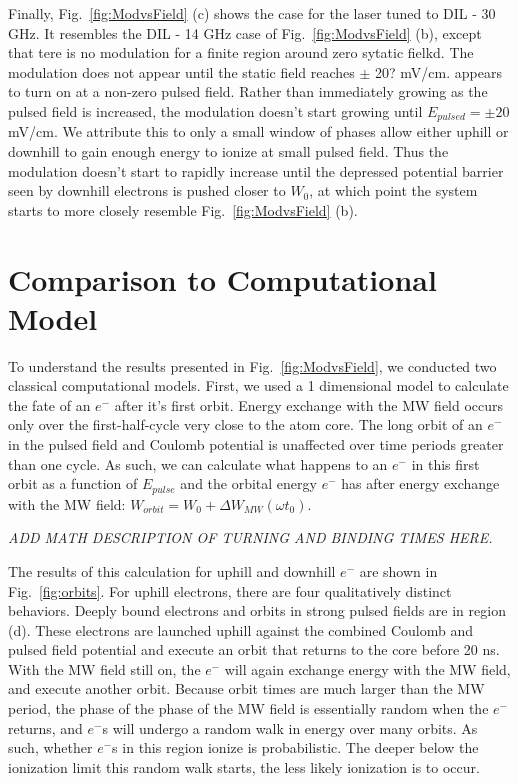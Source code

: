 \documentclass[aps,pra,preprint,groupedaddress]{revtex4-1}
\begin{document}
Finally, Fig.~\ref{fig:ModvsField} (c) shows the case for the laser tuned to DIL - 30 GHz. It resembles the DIL - 14 GHz case of Fig.~\ref{fig:ModvsField} (b), except that tere is no modulation for a finite region around zero sytatic fielkd. The modulation does not appear until the static field reaches $\pm$ 20? mV/cm. appears to turn on at a non-zero pulsed field. Rather than immediately growing as the pulsed field is increased, the modulation doesn't start growing until $E_{pulsed} = \pm 20$ mV/cm. We attribute this to only a small window of phases allow either uphill or downhill to gain enough energy to ionize at small pulsed field. Thus the modulation doesn't start to rapidly increase until the depressed potential barrier seen by downhill electrons is pushed closer to $W_0$, at which point the system starts to more closely resemble Fig.~\ref{fig:ModvsField} (b).

\section{\label{sec:disc} Comparison to Computational Model}

To understand the results presented in Fig.~\ref{fig:ModvsField}, we conducted two classical computational models.  First, we used a 1 dimensional model to calculate the fate of an $e^-$ after it's first orbit. Energy exchange with the MW field occurs only over the first-half-cycle very close to the atom core. The long orbit of an $e^-$ in the pulsed field and Coulomb potential is unaffected over time periods greater than one cycle. As such, we can calculate what happens to an $e^-$ in this first orbit as a function of $E_{pulse}$ and the orbital energy $e^-$ has after energy exchange with the MW field: $W_{orbit} = W_0 + \Delta W_{MW}(\omega t_0)$.

\emph{ADD MATH DESCRIPTION OF TURNING AND BINDING TIMES HERE.}

The results of this calculation for uphill and downhill $e^-$ are shown in Fig.~\ref{fig:orbits}. For uphill electrons, there are four qualitatively distinct behaviors. Deeply bound electrons and orbits in strong pulsed fields are in region (d). These electrons are launched uphill against the combined Coulomb and pulsed field potential and execute an orbit that returns to the core before 20 ns. With the MW field still on, the $e^-$ will again exchange energy with the MW field, and execute another orbit. Because orbit times are much larger than the MW period, the phase of the phase of the MW field is essentially random when the $e^-$ returns, and $e^-$s will undergo a random walk in energy over many orbits. As such, whether $e^-$s in this region ionize is probabilistic. The deeper below the ionization limit this random walk starts, the less likely ionization is to occur.
\end{document}
